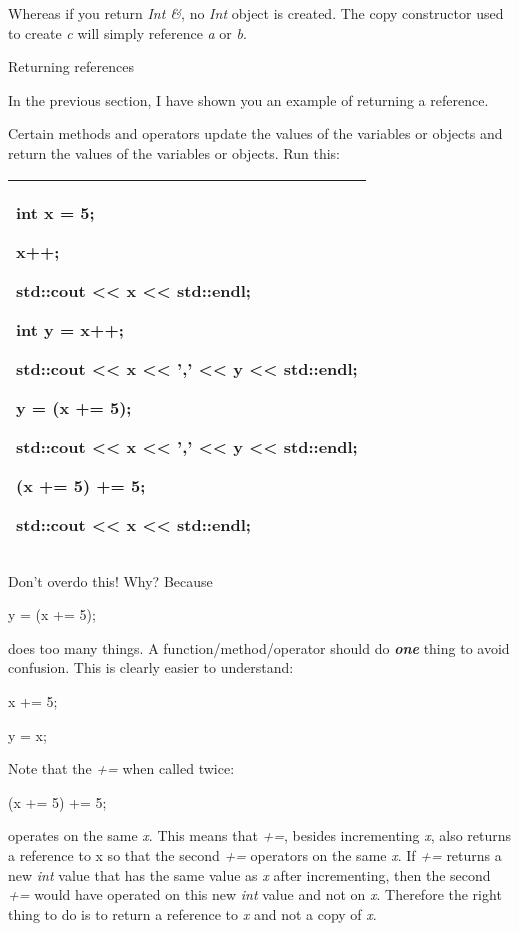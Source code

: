 \documentclass[
]{article}
\begin{document}
Whereas if you return \emph{Int \&}, no \emph{Int} object is created.
The copy constructor used to create \emph{c} will simply reference
\emph{a} or \emph{b}.

Returning references

In the previous section, I have shown you an example of returning a
reference.

Certain methods and operators update the values of the variables or
objects and return the values of the variables or objects. Run this:

\begin{longtable}[]{@{}l@{}}
\toprule
\endhead
\begin{minipage}[t]{0.97\columnwidth}\raggedright
int x = 5;

x++;

std::cout \textless\textless{} x \textless\textless{} std::endl;

int y = x++;

std::cout \textless\textless{} x \textless\textless{} ','
\textless\textless{} y \textless\textless{} std::endl;

y = (x += 5);

std::cout \textless\textless{} x \textless\textless{} ','
\textless\textless{} y \textless\textless{} std::endl;

(x += 5) += 5;

std::cout \textless\textless{} x \textless\textless{} std::endl;\strut
\end{minipage}\tabularnewline
\bottomrule
\end{longtable}

Don't overdo this! Why? Because

y = (x += 5);

does too many things. A function/method/operator should do
\emph{\textbf{one}} thing to avoid confusion. This is clearly easier to
understand:

x += 5;

y = x;

Note that the \emph{+=} when called twice:

(x += 5) += 5;

operates on the same \emph{x}. This means that \emph{+=}, besides
incrementing \emph{x}, also returns a reference to x so that the second
\emph{+=} operators on the same \emph{x}. If \emph{+=} returns a new
\emph{int} value that has the same value as \emph{x} after incrementing,
then the second \emph{+=} would have operated on this new \emph{int}
value and not on \emph{x}. Therefore the right thing to do is to return
a reference to \emph{x} and not a copy of \emph{x}.
\end{document}
